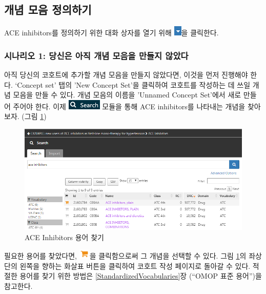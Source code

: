 \documentclass[10.5pt]{book}
\theoremstyle{definition}
\theoremstyle{definition}
\theoremstyle{definition}
\theoremstyle{remark}
\begin{document}
\subsection{개념 모음 정의하기}\label{--}

ACE inhibitors를 정의하기 위한 대화 상자를 열기 위해
\includegraphics{images/Cohorts/downarrow.png}을 클릭한다.

\subsubsection*{시나리오 1: 당신은 아직 개념 모음을 만들지
않았다}\label{-1------}

아직 당신의 코호트에 추가할 개념 모음을 만들지 않았다면, 이것을 먼저
진행해야 한다. `Concept set' 탭의 'New Concept Set'을 클릭하여 코호트를
작성하는 데 쓰일 개념 모음을 만들 수 있다. 개념 모음의 이름을 'Unnamed
Concept Set'에서 새로 만들어 주어야 한다. 이제
\includegraphics{images/Cohorts/search-2.png} 모듈을 통해 ACE
inhibitors를 나타내는 개념을 찾아보자. (그림 \ref{fig:aceinhibitors})

\begin{figure}

{\centering \includegraphics[width=1\linewidth]{images/Cohorts/aceinhibitors} 

}

\caption{ACE Inhibitors 용어 찾기}\label{fig:aceinhibitors}
\end{figure}

필요한 용어를 찾았다면,
\includegraphics{images/Cohorts/shoppingcart.png}을 클릭함으로써 그
개념을 선택할 수 있다. 그림 \ref{fig:aceinhibitors}의 좌상단의 왼쪽을
향하는 화살표 버튼을 클릭하여 코호트 작성 페이지로 돌아갈 수 있다.
적절한 용어를 찾기 위한 방법은 \ref{StandardizedVocabularies}장 (``OMOP
표준 용어'')을 참고한다.
\end{document}
